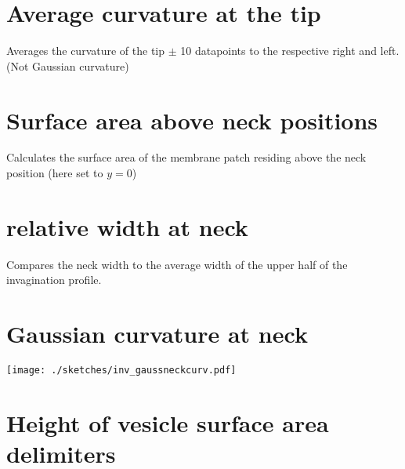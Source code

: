 \documentclass[10pt,a4paper,DIV17]{scrartcl}
\begin{document}
\section{Average curvature at the tip}
\begin{multicols}{2}

\columnbreak
Averages the curvature of the tip $\pm$ 10 datapoints to the respective right and left. (Not Gaussian curvature)
\end{multicols}

\section{Surface area above neck positions}
\begin{multicols}{2}

\columnbreak
Calculates the surface area of the membrane patch residing above the neck position (here set to $y=0$)
\end{multicols}

\section{relative width at neck}
\begin{multicols}{2}

\columnbreak
Compares the neck width to the average width of the upper half of the invagination profile.
\end{multicols}

\section{Gaussian curvature at neck}
\begin{multicols}{2}

\columnbreak
\texttt{[image: ./sketches/inv\_gaussneckcurv.pdf]}
\end{multicols}
\pagebreak

\section{Height of vesicle surface area delimiters}
\begin{multicols}{2}

\columnbreak
\end{multicols}
\end{document}
